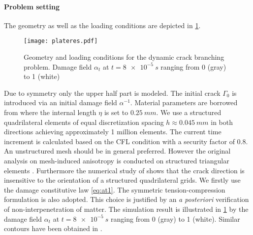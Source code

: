 \paragraph{Problem setting} The geometry as well as the loading conditions are depicted in \cref{fig:branching}.
\begin{figure}[htbp]
\centering
\texttt{[image: plateres.pdf]}
\caption{Geometry and loading conditions for the dynamic crack branching problem. Damage field $\alpha_t$ at $t=\SI{8e-5}{s}$ ranging from 0 (gray) to 1 (white)} \label{fig:branching}
\end{figure}
Due to symmetry only the upper half part is modeled. The initial crack $\Gamma_0$ is introduced via an initial damage field $\alpha^{-1}$. Material parameters are borrowed from \cite{BordenVerhooselScottHughesLandis:2012} where the internal length $\eta$ is set to $\SI{0.25}{mm}$. We use a structured quadrilateral elements of equal discretization spacing $h\approx\SI{0.045}{mm}$ in both directions achieving approximately 1 million elements. The current time increment is calculated based on the CFL condition with a security factor of 0.8. An unstructured mesh should be in general preferred. However the original analysis on mesh-induced anisotropy is conducted on structured triangular elements \cite{Negri:1999}. Furthermore the numerical study of \cite{LorentzGodard:2011} shows that the crack direction is insensitive to the orientation of a structured quadrilateral grids. We firstly use the damage constitutive law \eqref{eq:at1}. The symmetric tension-compression formulation is also adopted. This choice is justified by an \emph{a posteriori} verification of non-interpenetration of matter. The simulation result is illustrated in \cref{fig:branching} by the damage field $\alpha_t$ at $t=\SI{8e-5}{s}$ ranging from 0 (gray) to 1 (white). Similar contours have been obtained in \cite{BordenVerhooselScottHughesLandis:2012,SchlueterWillenbuecherKuhnMueller:2014}.

